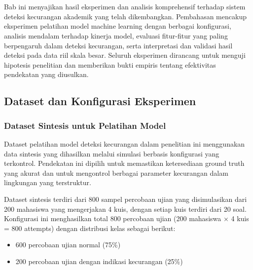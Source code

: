 
\chapter{\babEmpat}
\label{bab:4}

Bab ini menyajikan hasil eksperimen dan analisis komprehensif terhadap sistem deteksi kecurangan akademik yang telah dikembangkan. Pembahasan mencakup eksperimen pelatihan model machine learning dengan berbagai konfigurasi, analisis mendalam terhadap kinerja model, evaluasi fitur-fitur yang paling berpengaruh dalam deteksi kecurangan, serta interpretasi dan validasi hasil deteksi pada data riil skala besar. Seluruh eksperimen dirancang untuk menguji hipotesis penelitian dan memberikan bukti empiris tentang efektivitas pendekatan yang diusulkan.

\section{Dataset dan Konfigurasi Eksperimen}
\label{sec:datasetKonfigurasi}

\subsection{Dataset Sintesis untuk Pelatihan Model}
\label{subsec:datasetSintesis}

Dataset pelatihan model deteksi kecurangan dalam penelitian ini menggunakan data sintesis yang dihasilkan melalui simulasi berbasis konfigurasi yang terkontrol. Pendekatan ini dipilih untuk memastikan ketersediaan ground truth yang akurat dan untuk mengontrol berbagai parameter kecurangan dalam lingkungan yang terstruktur.

Dataset sintesis terdiri dari 800 sampel percobaan ujian yang disimulasikan dari 200 mahasiswa yang mengerjakan 4 kuis, dengan setiap kuis terdiri dari 20 soal. Konfigurasi ini menghasilkan total 800 percobaan ujian (200 mahasiswa × 4 kuis = 800 attempts) dengan distribusi kelas sebagai berikut:
\begin{itemize}
    \item 600 percobaan ujian normal (75\%)
    \item 200 percobaan ujian dengan indikasi kecurangan (25\%)
\end{itemize}

